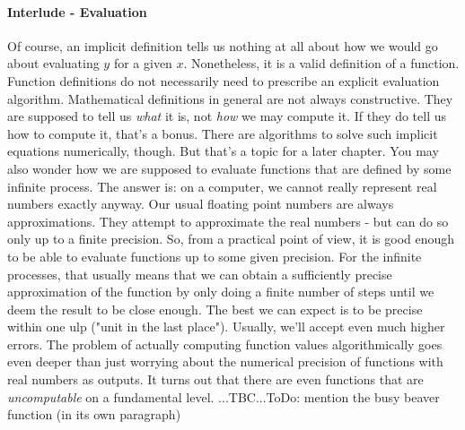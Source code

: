 





\paragraph{Interlude - Evaluation}
Of course, an implicit definition tells us nothing at all about how we would go about evaluating $y$ for a given $x$. Nonetheless, it is a valid definition of a function. Function definitions do not necessarily need to prescribe an explicit evaluation algorithm. Mathematical definitions in general are not always constructive. They are supposed to tell us \emph{what} it is, not \emph{how} we may compute it. If they do tell us how to compute it, that's a bonus. There are algorithms to solve such implicit equations numerically, though. But that's a topic for a later chapter. You may also wonder how we are supposed to evaluate functions that are defined by some infinite process. The answer is: on a computer, we cannot really represent real numbers exactly anyway. Our usual floating point numbers are always approximations. They attempt to approximate the real numbers - but can do so only up to a finite precision. So, from a practical point of view, it is good enough to be able to evaluate functions up to some given precision. For the infinite processes, that usually means that we can obtain a sufficiently precise approximation of the function by only doing a finite number of steps until we deem the result to be close enough. The best we can expect is to be precise within one ulp ("unit in the last place"). Usually, we'll accept even much higher errors. The problem of actually computing function values algorithmically goes even deeper than just worrying about the numerical precision of functions with real numbers as outputs. It turns out that there are even functions that are \emph{uncomputable} on a fundamental level. ...TBC...ToDo: mention the busy beaver function (in its own paragraph)

